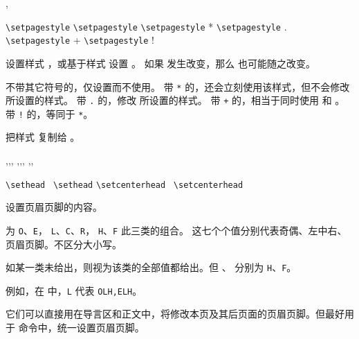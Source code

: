 \documentclass{cusdoc}
\begin{document}
\begin{function}{\setpagestyle,\copypagestyle}
  \begin{syntax}
    \verb|\setpagestyle|    
    \verb|\setpagestyle|     
    \verb|\setpagestyle| *   
    \verb|\setpagestyle| .   
    \verb|\setpagestyle| +   
    \verb|\setpagestyle| !   
    \V\copypagestyle  {} 
  \end{syntax}
设置样式 ，或基于样式  设置 。
如果  发生改变，那么  也可能随之改变。

不带其它符号的，仅设置而不使用。
带 \verb|*| 的，还会立刻使用该样式，但不会修改  所设置的样式。
带 \verb|.| 的，修改  所设置的样式。
带 \verb|+| 的，相当于同时使用  和 。
带 \verb|!| 的，等同于 \texttt{*}。

 把样式  复制给 。
\end{function}

\begin{function}{\sethead,\setfoot,\setheadfoot,
  \setlefthead,\setcenterhead,\setrighthead,
  \setleftfoot,\setcenterfoot,\setrightfoot}
  \begin{syntax}
    \verb|\sethead|         \,
    \verb|\sethead|  
    \verb|\setcenterhead|           \,
    \verb|\setcenterhead|  
  \end{syntax}
设置页眉页脚的内容。

 为 \texttt{O}、\texttt{E}， \texttt{L}、\texttt{C}、\texttt{R}，
\texttt{H}、\texttt{F} 此三类的组合。
这七个个值分别代表奇偶、左中右、页眉页脚。不区分大小写。

如某一类未给出，则视为该类的全部值都给出。但 、 分别为 \texttt{H}、\texttt{F}。

例如，在  中，\verb|L| 代表 \verb|OLH,ELH|。

它们可以直接用在导言区和正文中，将修改本页及其后页面的页眉页脚。但最好用于 
 命令中，统一设置页眉页脚。
\end{function}
\end{document}

